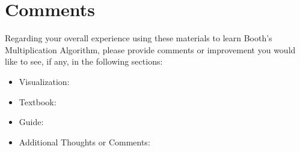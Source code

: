 \documentclass[letter]{article}
\begin{document}
\begin{enumerate}
\begin{comment}
\section*{Other Questions}

\item The use of colors in the visualization was confusing or unclear.
(Agree / Disagree) %

\item The input generator was easy to understand and use.
(Agree / Disagree)

\item I read through some parts of the hypertext book more than once to improve my understanding of the topic.
(True) (False)

\item The guide was informative and helpful for setting up and using the visualization.
(Agree / Disagree) (This question is for our own reference and will not be analysed for research purposes) %

\end{comment}

\end{enumerate}

\section*{Comments}

Regarding your overall experience using these materials to learn Booth's Multiplication Algorithm, please provide comments or improvement you would like to see, if any, in the following sections:
\begin{itemize}
\item Visualization:
\vspace{.75cm}
\item Textbook:
\vspace{.75cm}
\item Guide:
\vspace{.75cm}
\item Additional Thoughts or Comments:

\end{itemize}
\end{document}
